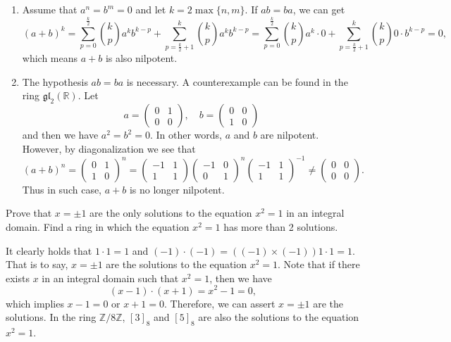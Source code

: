 \documentclass[12pt,letterpaper,boxed]{hmcpset}
\begin{document}
\begin{solution}
	\begin{enumerate}
		\item Assume that $a^n=b^m=0$ and let $k=2\max\{n,m\}$. If $ab = ba$, we can get
		\[
		(a+b)^k=\sum_{p=0}^{\tfrac{k}{2}}\binom{k}{p}a^kb^{k-p}+\sum_{p=\tfrac{k}{2}+1}^{k}\binom{k}{p}a^kb^{k-p}=\sum_{p=0}^{\tfrac{k}{2}}\binom{k}{p}a^k\cdot 0+\sum_{p=\tfrac{k}{2}+1}^{k}\binom{k}{p}0\cdot b^{k-p}=0,
		\]
		which means $a+b$ is also nilpotent.
		\item The hypothesis $ab = ba$ is necessary. A counterexample can be found in the ring $\mathfrak{gl}_2(\mathbb{R})$. Let
		\[
		a=\left(
		\begin{matrix}	
		0 & 1\\	
		0 & 0	
		\end{matrix}
		\right),\quad
		b=\left(
		\begin{matrix}	
		0 & 0\\	
		1 & 0	
		\end{matrix}
		\right)
		\]
		and then we have $a^2=b^2=0$. In other words, $a$ and $b$ are nilpotent. However, by diagonalization we see that
		\[
		(a+b)^n=
		\left(
		\begin{matrix}	
		0 & 1\\	
		1 & 0	
		\end{matrix}
		\right)^n
		=\left(
		\begin{matrix}	
		-1 & 1\\	
		1 & 1	
		\end{matrix}
		\right)
		\left(
		\begin{matrix}	
		-1 & 0\\	
		0 & 1	
		\end{matrix}
		\right)^n
		\left(
		\begin{matrix}	
		-1 & 1\\	
		1 & 1	
		\end{matrix}
		\right)^{-1}\ne 
		\left(
		\begin{matrix}	
		0 & 0\\	
		0 & 0	
		\end{matrix}
		\right).
		\]
		Thus in such case, $a+b$ is no longer nilpotent.
	\end{enumerate}
\end{solution}

\begin{problem}[1.8]
	Prove that $x = \pm1$ are the only solutions to the equation $x^2 = 1$ in an integral	domain. Find a ring in which the equation $x^2 = 1$ has more than 2 solutions.
\end{problem}
\begin{solution}
	It clearly holds that $1\cdot1=1$ and $(-1)\cdot(-1)=((-1)\times(-1))1\cdot1=1$. That is to say,  $x = \pm1$ are the solutions to the equation $x^2 = 1$. Note that if there exists $x$ in an integral	domain such that $x^2=1$, then we have
	\[
	(x-1)\cdot(x+1)=x^2-1=0,
	\]
	which implies $x-1=0$ or $x+1=0$. Therefore, we can assert $x = \pm1$ are the solutions. In the ring $\mathbb{Z}/8\mathbb{Z}$, $[3]_8$ and $[5]_8$ are also the solutions to the equation $x^2 = 1$.
\end{solution}
\end{document}
